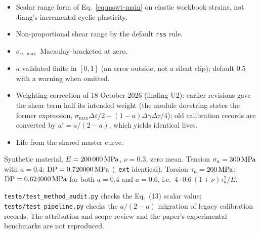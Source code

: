 \begin{itemize}
\item Scalar range form of Eq.~\eqref{eq:mswt-main} on elastic workbook strains, not Jiang's
  incremental cyclic plasticity.
\item Non-proportional shear range by the default \texttt{rss} rule.
\item $\sigma_{n,\max}$ Macaulay-bracketed at zero.
\item $a$ validated finite in $[0,1]$ (an error outside, not a silent clip); default 0.5 with a
  warning when omitted.
\item Weighting correction of 18 October 2026 (finding U2): earlier revisions gave the shear term
  half its intended weight (the module docstring states the former expression,
  $\sigma_{\max}\Delta\varepsilon/2+(1-a)\Delta\gamma\Delta\tau/4$); old calibration records are
  converted by $a'=a/(2-a)$, which yields identical lives.
\item Life from the shared master curve.
\end{itemize}

 Synthetic material, $E=200\,000\,\mathrm{MPa}$, $\nu=0.3$, zero mean. Tension
$\sigma_a=300\,\mathrm{MPa}$ with $a=0.4$: $\mathrm{DP}=0.720000\,\mathrm{MPa}$ (\texttt{\_ext} identical). Torsion
$\tau_a=200\,\mathrm{MPa}$: $\mathrm{DP}=0.624000\,\mathrm{MPa}$ for both $a=0.4$ and $a=0.6$, i.e.\
$4\cdot0.6\,(1+\nu)\tau_a^2/E$.

 \texttt{tests/test\_method\_audit.py} checks the Eq.~(13) scalar value;
\texttt{tests/test\_pipeline.py} checks the $a/(2-a)$ migration of legacy calibration records.
The attribution and scope review and the paper's experimental benchmarks are not reproduced.
